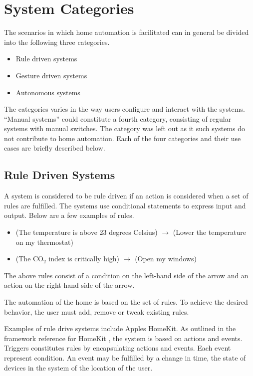 \section{System Categories}\label{sec:system-categories}

The scenarios in which home automation is facilitated can in general be divided into the following three categories.

\begin{itemize}
\item Rule driven systems
\item Gesture driven systems
\item Autonomous systems
\end{itemize}

The categories varies in the way users configure and interact with the systems. 
``Manual systems'' could constitute a fourth category, consisting of regular systems with manual switches. 
The category was left out as it such systems do not contribute to home automation.
Each of the four categories and their use cases are briefly described below.

\subsection{Rule Driven Systems}

A system is considered to be rule driven if an action is considered when a set of rules are  fulfilled. 
The systems use conditional statements to express input and output. Below are a few examples of rules.

\begin{itemize}
\item (The temperature is above 23 degrees Celsius) $\rightarrow$ (Lower the temperature on my thermostat)
\item (The CO$_2$ index is critically high) $\rightarrow$ (Open my windows)
\end{itemize}

The above rules consist of a condition on the left-hand side of the arrow and an action on the right-hand side of the arrow.

The automation of the home is based on the set of rules. 
To achieve the desired behavior, the user must add, remove or tweak existing rules.

Examples of rule drive systems include Apples HomeKit. 
As outlined in the framework reference for HomeKit \cite{applehomekitref}, the system is based on actions and events. 
Triggers constitutes rules by encapsulating actions and events. 
Each event represent condition. An event may be fulfilled by a change in time, the state of devices in the system of the location of the user.

